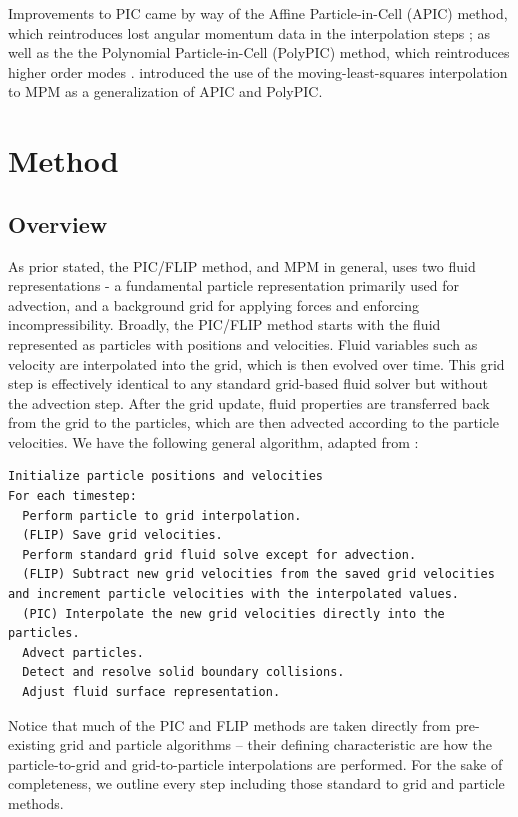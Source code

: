 \documentclass[sigconf]{acmart}
\begin{document}
Improvements to PIC came by way of the Affine Particle-in-Cell (APIC) method, which reintroduces lost angular momentum data in the interpolation steps \cite{jiang2015}; as well as the the Polynomial Particle-in-Cell (PolyPIC) method, which reintroduces higher order modes \cite{fu2017}. \cite{hu2018} introduced the use of the moving-least-squares interpolation to MPM as a generalization of APIC and PolyPIC.

\section{Method}

\subsection{Overview}

As prior stated, the PIC/FLIP method, and MPM in general, uses two fluid representations - a fundamental particle representation primarily used for advection, and a background grid for applying forces and enforcing incompressibility. Broadly, the PIC/FLIP method starts with the fluid represented as particles with positions and velocities. Fluid variables such as velocity are interpolated into the grid, which is then evolved over time. This grid step is effectively identical to any standard grid-based fluid solver but without the advection step. After the grid update, fluid properties are transferred back from the grid to the particles, which are then advected according to the particle velocities. We have the following general algorithm, adapted from \cite{zhu2005}:
\begin{lstlisting}[style=myStyle]
Initialize particle positions and velocities
For each timestep:
  Perform particle to grid interpolation.
  (FLIP) Save grid velocities.
  Perform standard grid fluid solve except for advection.
  (FLIP) Subtract new grid velocities from the saved grid velocities and increment particle velocities with the interpolated values.
  (PIC) Interpolate the new grid velocities directly into the particles.
  Advect particles.
  Detect and resolve solid boundary collisions.
  Adjust fluid surface representation.
\end{lstlisting}
Notice that much of the PIC and FLIP methods are taken directly from pre-existing grid and particle algorithms -- their defining characteristic are how the particle-to-grid and grid-to-particle interpolations are performed. For the sake of completeness, we outline every step including those standard to grid and particle methods.
\end{document}
